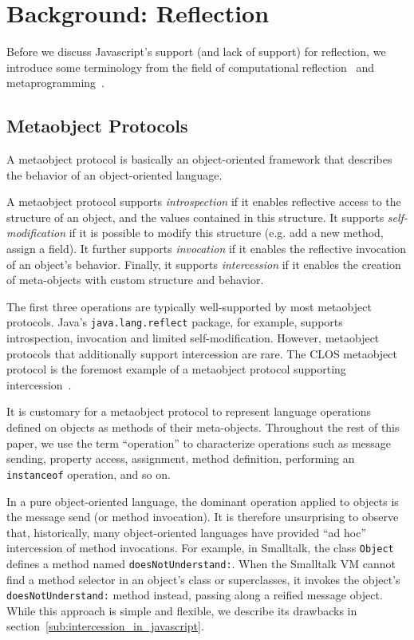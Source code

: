 \documentclass{acm_proc_article-sp}
\begin{document}
\section{Background: Reflection}

Before we discuss Javascript's support (and lack of support) for reflection, we introduce some terminology from the field of computational reflection~\cite{maes-oopsla87} and metaprogramming~\cite{kiczales-artofthemop}.

\subsection{Metaobject Protocols}
\label{sub:metaobject_protocols}

A metaobject protocol is basically an object-oriented framework that describes the behavior of an object-oriented language.

A metaobject protocol supports \emph{introspection} if it enables reflective access to the structure of an object, and the values contained in this structure. It supports \emph{self-modification} if it is possible to modify this structure (e.g. add a new method, assign a field). It further supports \emph{invocation} if it enables the reflective invocation of an object's behavior. Finally, it supports \emph{intercession} if it enables the creation of meta-objects with custom structure and behavior.

The first three operations are typically well-supported by most metaobject protocols. Java's \texttt{java.lang.reflect} package, for example, supports introspection, invocation and limited self-modification. However, metaobject protocols that additionally support intercession are rare. The CLOS metaobject protocol is the foremost example of a metaobject protocol supporting intercession~\cite{clos}.

It is customary for a metaobject protocol to represent language operations defined on objects as methods of their meta-objects. Throughout the rest of this paper, we use the term ``operation'' to characterize operations such as message sending, property access, assignment, method definition, performing an \texttt{instanceof} operation, and so on.

In a pure object-oriented language, the dominant operation applied to objects is the message send (or method invocation). It is therefore unsurprising to observe that, historically, many object-oriented languages have provided ``ad hoc'' intercession of method invocations. For example, in Smalltalk, the class \texttt{Object} defines a method named \texttt{doesNotUnderstand:}. When the Smalltalk VM cannot find a method selector in an object's class or superclasses, it invokes the object's \texttt{doesNotUnderstand:} method instead, passing along a reified message object. While this approach is simple and flexible, we describe its drawbacks in section~\ref{sub:intercession_in_javascript}.
\end{document}
